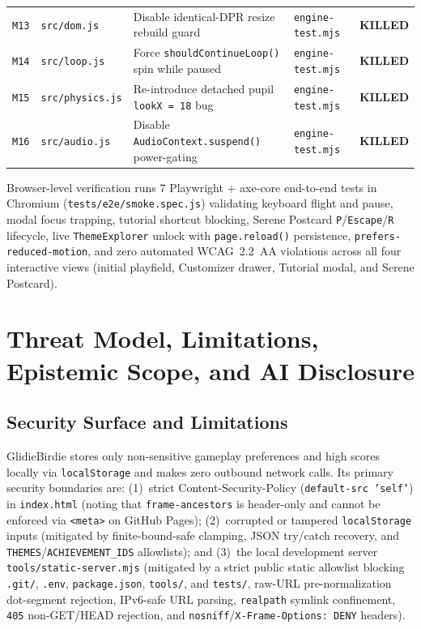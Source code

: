 \documentclass[11pt,letterpaper]{article}
\theoremstyle{remark}
\begin{document}
\begin{table}[ht]
\begin{tabular}{@{} c l >{\raggedright\arraybackslash}p{6.5cm} l c @{}}
\texttt{M13} & \texttt{src/dom.js} & Disable identical-DPR resize rebuild guard & \texttt{engine-test.mjs} & \textbf{KILLED} \\
\texttt{M14} & \texttt{src/loop.js} & Force \texttt{shouldContinueLoop()} spin while paused & \texttt{engine-test.mjs} & \textbf{KILLED} \\
\texttt{M15} & \texttt{src/physics.js} & Re-introduce detached pupil \texttt{lookX = 18} bug & \texttt{engine-test.mjs} & \textbf{KILLED} \\
\texttt{M16} & \texttt{src/audio.js} & Disable \texttt{AudioContext.suspend()} power-gating & \texttt{engine-test.mjs} & \textbf{KILLED} \\
\bottomrule
\end{tabular}
\end{table}

Browser-level verification runs 7 Playwright + axe-core end-to-end tests in Chromium (\texttt{tests/\allowbreak e2e/\allowbreak smoke.spec.js}) validating keyboard flight and pause, modal focus trapping, tutorial shortcut blocking, Serene Postcard \texttt{P}/\texttt{Escape}/\texttt{R} lifecycle, live \texttt{ThemeExplorer} unlock with \texttt{page.\allowbreak reload()} persistence, \texttt{prefers-\allowbreak reduced-\allowbreak motion}, and zero automated WCAG~2.2~AA violations across all four interactive views (initial playfield, Customizer drawer, Tutorial modal, and Serene Postcard).

\section{Threat Model, Limitations, Epistemic Scope, and AI Disclosure}
\label{sec:limits}

\subsection{Security Surface and Limitations}
GlidieBirdie stores only non-sensitive gameplay preferences and high scores locally via \texttt{localStorage} and makes zero outbound network calls. Its primary security boundaries are: (1)~strict Content-Security-Policy (\texttt{default-src 'self'}) in \texttt{index.html} (noting that \texttt{frame-ancestors} is header-only and cannot be enforced via \texttt{<meta>} on GitHub Pages); (2)~corrupted or tampered \texttt{localStorage} inputs (mitigated by finite-bound-safe clamping, JSON try/catch recovery, and \texttt{THEMES}/\allowbreak\texttt{ACHIEVEMENT\_IDS} allowlists); and (3)~the local development server \texttt{tools/static-server.mjs} (mitigated by a strict public static allowlist blocking \texttt{.git/}, \texttt{.env}, \texttt{package.json}, \texttt{tools/}, and \texttt{tests/}, raw-URL pre-normalization dot-segment rejection, IPv6-safe URL parsing, \texttt{realpath} symlink confinement, \texttt{405} non-GET/HEAD rejection, and \texttt{nosniff}/\allowbreak\texttt{X-Frame-Options: DENY} headers).
\end{document}
